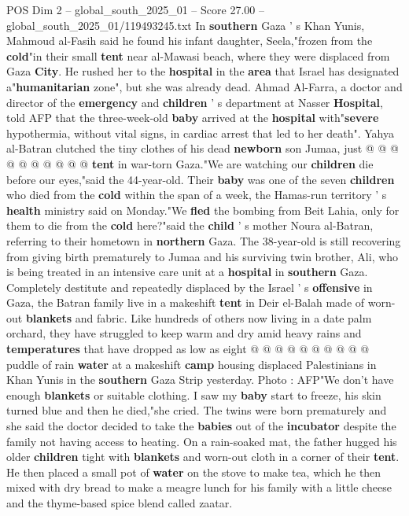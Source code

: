 \begin{textsample}{POS Dim 2 – global\_south\_2025\_01 – Score 27.00 – global\_south\_2025\_01/119493245.txt}
In \textbf{southern} Gaza ' s Khan Yunis, Mahmoud al-Fasih said he found his infant daughter, Seela,"frozen from the \textbf{cold}"in their small \textbf{tent} near al-Mawasi beach, where they were displaced from Gaza \textbf{City}.
He rushed her to the \textbf{hospital} in the \textbf{area} that Israel has designated a"\textbf{humanitarian} zone", but she was already dead.
Ahmad Al-Farra, a doctor and director of the \textbf{emergency} and \textbf{children} ' s department at Nasser \textbf{Hospital}, told AFP that the three-week-old \textbf{baby} arrived at the \textbf{hospital} with"\textbf{severe} hypothermia, without vital signs, in cardiac arrest that led to her death".
Yahya al-Batran clutched the tiny clothes of his dead \textbf{newborn} son Jumaa, just @ @ @ @ @ @ @ @ @ @ \textbf{tent} in war-torn Gaza."We are watching our \textbf{children} die before our eyes,"said the 44-year-old.
Their \textbf{baby} was one of the seven \textbf{children} who died from the \textbf{cold} within the span of a week, the Hamas-run territory ' s \textbf{health} ministry said on Monday."We \textbf{fled} the bombing from Beit Lahia, only for them to die from the \textbf{cold} here?"said the \textbf{child} ' s mother Noura al-Batran, referring to their hometown in \textbf{northern} Gaza.
The 38-year-old is still recovering from giving birth prematurely to Jumaa and his surviving twin brother, Ali, who is being treated in an intensive care unit at a \textbf{hospital} in \textbf{southern} Gaza.
Completely destitute and repeatedly displaced by the Israel ' s \textbf{offensive} in Gaza, the Batran family live in a makeshift \textbf{tent} in Deir el-Balah made of worn-out \textbf{blankets} and fabric.
Like hundreds of others now living in a date palm orchard, they have struggled to keep warm and dry amid heavy rains and \textbf{temperatures} that have dropped as low as eight @ @ @ @ @ @ @ @ @ @ puddle of rain \textbf{water} at a makeshift \textbf{camp} housing displaced Palestinians in Khan Yunis in the \textbf{southern} Gaza Strip yesterday.
Photo : AFP"We don't have enough \textbf{blankets} or suitable clothing.
I saw my \textbf{baby} start to freeze, his skin turned blue and then he died,"she cried.
The twins were born prematurely and she said the doctor decided to take the \textbf{babies} out of the \textbf{incubator} despite the family not having access to heating.
On a rain-soaked mat, the father hugged his older \textbf{children} tight with \textbf{blankets} and worn-out cloth in a corner of their \textbf{tent}.
He then placed a small pot of \textbf{water} on the stove to make tea, which he then mixed with dry bread to make a meagre lunch for his family with a little cheese and the thyme-based spice blend called zaatar.

\end{textsample}
